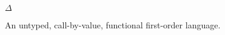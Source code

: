 \begin{frame}

\begin{center}

{\fontsize{40}{20} $\Delta$}

\vspace{0.5in}

An untyped, call-by-value, functional first-order language.

\end{center}

\end{frame}

